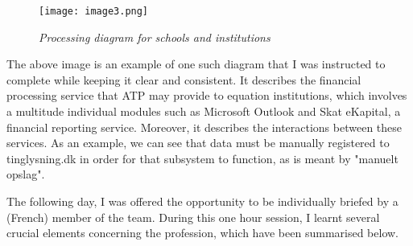 \begin{figure}[H]
    \centering
        \texttt{[image: image3.png]}
        \caption*{\textit{Processing diagram for schools and institutions}}
\end{figure}

The above image is an example of one such diagram that I was instructed to
complete while keeping it clear and consistent. It describes the financial
processing service that ATP may provide to equation institutions, which involves
a multitude individual modules such as Microsoft Outlook and Skat eKapital, a
financial reporting service. Moreover, it describes the interactions between
these services. As an example, we can see that data must be manually registered
to tinglysning.dk in order for that subsystem to function, as is meant by
"manuelt opslag".

The following day, I was offered the opportunity to be individually briefed by a
(French) member of the team. During this one hour session, I learnt several
crucial elements concerning the profession, which have been summarised below.

